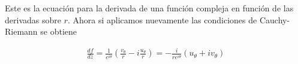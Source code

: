 Este es la ecuación para la derivada de una función compleja en función de las derivadas sobre $r$. Ahora si aplicamos nuevamente las condiciones de Cauchy-Riemann se obtiene 


\begin{mdframed}
    \vspace{-0.25cm}
    \begin{gather}
        \frac{df}{dz} = \frac{1}{e^{i\theta}}\left(\frac{v_\theta}{r} - i\frac{u_\theta}{r}\right) = -\frac{i}{re^{i\theta}}\left(u_\theta + iv_\theta\right)
    \end{gather}    
    \vspace{-0.3cm}
\end{mdframed}